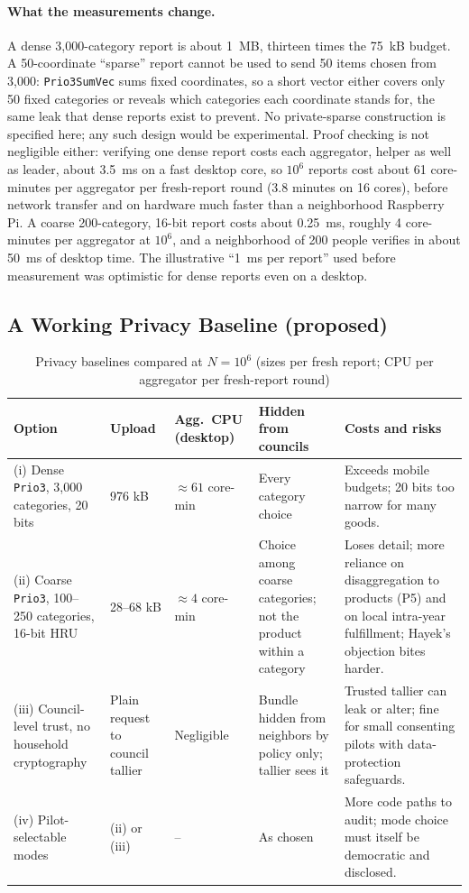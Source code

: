 \documentclass[10pt,twoside,openany]{book}
\theoremstyle{dpepstyle}
\begin{document}
\paragraph{What the measurements change.}
A dense 3,000-category report is about 1~MB, thirteen times the 75~kB budget. A 50-coordinate ``sparse'' report cannot be used to send 50 items chosen from 3,000: \texttt{Prio3SumVec} sums fixed coordinates, so a short vector either covers only 50 fixed categories or reveals which categories each coordinate stands for, the same leak that dense reports exist to prevent. No private-sparse construction is specified here; any such design would be experimental. Proof checking is not negligible either: verifying one dense report costs each aggregator, helper as well as leader, about 3.5~ms on a fast desktop core, so $10^6$ reports cost about 61 core-minutes per aggregator per fresh-report round (3.8 minutes on 16 cores), before network transfer and on hardware much faster than a neighborhood Raspberry Pi. A coarse 200-category, 16-bit report costs about 0.25~ms, roughly 4 core-minutes per aggregator at $10^6$, and a neighborhood of 200 people verifies in about 50~ms of desktop time. The illustrative ``1~ms per report'' used before measurement was optimistic for dense reports even on a desktop.

\subsection{A Working Privacy Baseline (proposed)}
\label{sec:privacy-baseline}

\begin{table}[htbp]
\centering
\caption{Privacy baselines compared at $N=10^6$ (sizes per fresh report; CPU per aggregator per fresh-report round)}
\label{tab:privacy-options}
\scriptsize
\setlength{\tabcolsep}{3pt}
\begin{tabularx}{\textwidth}{L{1.05in} L{0.62in} L{0.70in} L{1.05in} Y}
\toprule
\textbf{Option} & \textbf{Upload} & \textbf{Agg.\ CPU (desktop)} & \textbf{Hidden from councils} & \textbf{Costs and risks} \\
\midrule
(i) Dense \texttt{Prio3}, 3,000 categories, 20 bits & 976 kB & $\approx 61$ core-min & Every category choice & Exceeds mobile budgets; 20 bits too narrow for many goods. \\
(ii) Coarse \texttt{Prio3}, 100--250 categories, 16-bit HRU & 28--68 kB & $\approx 4$ core-min & Choice among coarse categories; not the product within a category & Loses detail; more reliance on disaggregation to products (P5) and on local intra-year fulfillment; Hayek's objection bites harder. \\
(iii) Council-level trust, no household cryptography & Plain request to council tallier & Negligible & Bundle hidden from neighbors by policy only; tallier sees it & Trusted tallier can leak or alter; fine for small consenting pilots with data-protection safeguards. \\
(iv) Pilot-selectable modes & (ii) or (iii) & -- & As chosen & More code paths to audit; mode choice must itself be democratic and disclosed. \\
\bottomrule
\end{tabularx}
\end{table}
\end{document}
